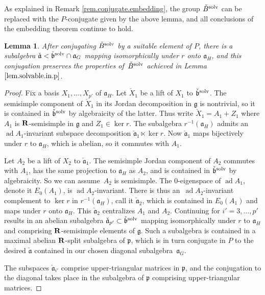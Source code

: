 \documentclass[10pt,a4paper]{amsart}
\numberwithin{equation}{section}
\newtheorem{lem}[thm]{Lemma}
\theoremstyle{definition}
\newcommand{\BR}{{\bf R}}
\def\g{{\mathfrak g}}
\def\p{{\mathfrak p}}
\def\a{{\mathfrak a}}
\def\b{{\mathfrak b}}
\newcommand{\ad}{\operatorname{ad}}
\begin{document}
As explained in Remark \ref{rem.conjugate.embedding}, the group $\check{B}^{\rm solv}$ can be replaced with the $P$-conjugate given by the above lemma, and all conclusions of the embedding theorem continue to hold.

 \begin{lem}
After conjugating $\check{B}^{\rm solv}$ by a suitable element of $P$, there is a subalgebra $ \check{\a} < \check{\b}^{\rm solv} \cap \a_G$ mapping isomorphically under $r$ onto $\a_H$, and this conjugation preserves the properties of~$\check{B}^{\rm solv}$ achieved in Lemma~$\ref{lem.solvable.in.p}$.
 \end{lem}

 \begin{proof}
 Fix a basis $X_1, \dots, X_{p'}$ of $\a_H$. Let $\check{X}_1$ be a lift of $X_1$ to $\check{\b}^{\rm solv}$. The semisimple component of $\check{X}_1$ in its Jordan decomposition in $\g$ is nontrivial, so it is contained in $\check{\b}^{\rm solv}$ by algebraicity of the latter. Thus write $\check{X}_1 = A_1 + Z_1$ where $A_1$ is $\BR$-semisimple in $\g$ and $Z_1 \in \ker r$. The subalgebra $r^{-1}(\a_H)$ admits an $\ad A_1$-invariant subspace decomposition $\check{\a}_1 \ltimes \ker r$. Now $\check{\a}_1$ maps bijectively under $r$ to $\a_H$, which is abelian, so it commutes with $A_1$.

 Let $A_2$ be a lift of $X_2$ to $\check{\a}_1$. The semisimple Jordan component of $A_2$ commutes with $A_1$, has the same projection to $\a_H$ as $A_2$, and is contained in $\check{\b}^{\rm solv}$ by algebraicity. So we can assume~$A_2$ is semisimple. The $0$-eigenspace of $\ad A_1$, denote it $E_0(A_1)$, is $\ad A_2$-invariant. There is thus an~$\ad A_2$-invariant complement to $\ker r$ in $r^{-1}(\a_H)$, call it $\check{\a}_2$, which is contained in $E_0(A_1)$ and maps under $r$ onto $\a_H$. This $\check{\a}_2$ centralizes $A_1$ and $A_2$. Continuing for $i' = 3, \dots, p'$ results in an abelian subalgebra $\check{\a}_{p'} \subset \check{\b}^{\rm solv}$ mapping isomorphically under $r$ to $\a_H$ and comprising $\BR$-semisimple elements of $\g$. Such a subalgebra is contained in a maximal abelian $\BR$-split subalgebra of $\p$, which is in turn conjugate in $P$ to the desired $\check{\a}$ contained in our chosen diagonal subalgebra~$\a_G$.

The subspaces $\check{\a}_{i'}$ comprise upper-triangular matrices in $\p$, and the conjugation to the diagonal takes place in the subalgebra of $\p$ comprising upper-triangular matrices.
 \end{proof}
\end{document}

